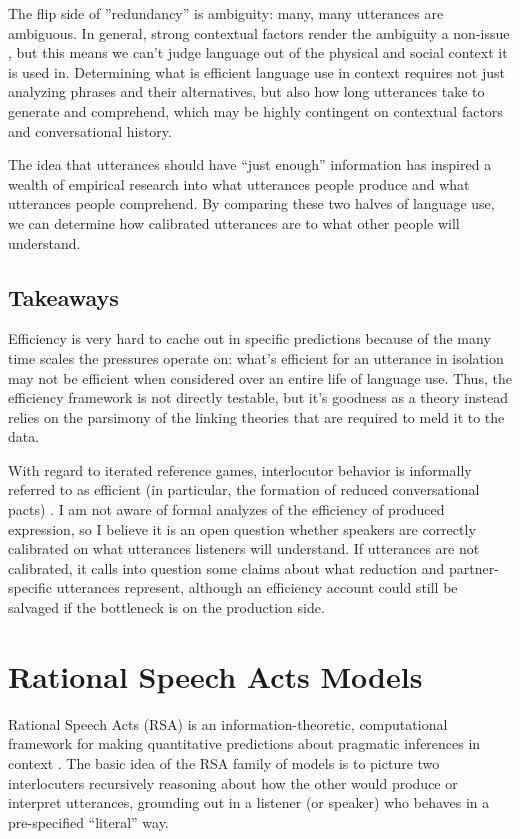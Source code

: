 \documentclass[]{article}
\begin{document}
The flip side of ''redundancy'' is ambiguity: many, many utterances are ambiguous. In general, strong contextual factors render the ambiguity a non-issue \cite{piantadosi2012}, but this means we can't judge language out of the physical and social context it is used in. Determining what is efficient language use in context requires not just analyzing phrases and their alternatives, but also how long utterances take to generate and comprehend, which may be highly contingent on contextual factors and conversational history. 

The idea that utterances should have ``just enough'' information has inspired a wealth of empirical research into what utterances people produce and what utterances people comprehend. By comparing these two halves of language use, we can determine how calibrated utterances are to what other people will understand. 

\subsection{Takeaways}
Efficiency is very hard to cache out in specific predictions because of the many time scales the pressures operate on: what's efficient for an utterance in isolation may not be efficient when considered over an entire life of language use. Thus, the efficiency framework is not directly testable, but it's goodness as a theory instead relies on the parsimony of the linking theories that are required to meld it to the data. 

With regard to iterated reference games, interlocutor behavior is informally referred to as efficient (in particular, the formation of reduced conversational pacts) \citep{clark1986, hawkins2020b}. I am not aware of formal analyzes of the efficiency of produced expression, so I believe it is an open question whether speakers are correctly calibrated on what utterances listeners will understand. If utterances are not calibrated, it calls into question some claims about what reduction and partner-specific utterances represent, although an efficiency account could still be salvaged if the bottleneck is on the production side.

\section{Rational Speech Acts Models}

Rational Speech Acts (RSA) is an information-theoretic, computational framework for making quantitative predictions about pragmatic inferences in context \citep{goodman2016, frank2012a}. The basic idea of the RSA family of models is to picture two interlocuters recursively reasoning about how the other would produce or interpret utterances, grounding out in a listener (or speaker) who behaves in a pre-specified ``literal'' way. 
\end{document}
